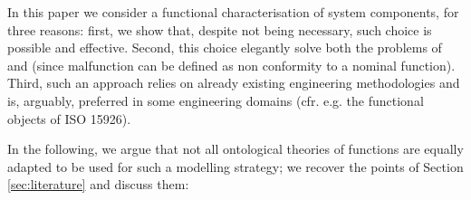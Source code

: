 \documentclass[
]{ceurart}
\begin{document}
In this paper we consider a functional characterisation of system components, for three reasons: first, we show that, despite not being necessary, such choice is possible and effective. Second, this choice elegantly solve both the problems of  and  (since malfunction can be defined as non conformity to a nominal function). Third, such an approach relies on already existing engineering methodologies and is, arguably, preferred in some engineering domains (cfr. e.g. the functional objects of ISO 15926).

In the following, we argue that not all ontological theories of functions are equally adapted to be used for such a modelling strategy; we recover the points of Section \ref{sec:literature} and discuss them: 
\end{document}
